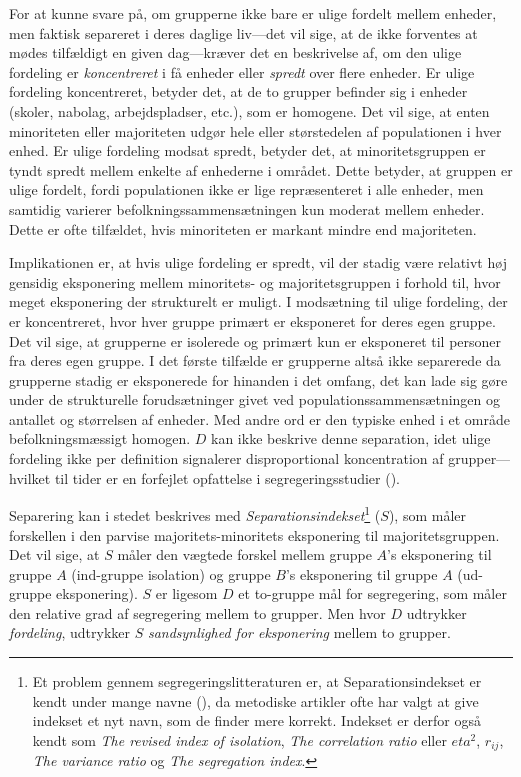 \documentclass[
]{book}
\begin{document}
For at kunne svare på, om grupperne ikke bare er ulige fordelt mellem enheder, men faktisk separeret i deres daglige liv---det vil sige, at de ikke forventes at mødes tilfældigt en given dag---kræver det en beskrivelse af, om den ulige fordeling er \emph{koncentreret} i få enheder eller \emph{spredt} over flere enheder. Er ulige fordeling koncentreret, betyder det, at de to grupper befinder sig i enheder (skoler, nabolag, arbejdspladser, etc.), som er homogene. Det vil sige, at enten minoriteten eller majoriteten udgør hele eller størstedelen af populationen i hver enhed. Er ulige fordeling modsat spredt, betyder det, at minoritetsgruppen er tyndt spredt mellem enkelte af enhederne i området. Dette betyder, at gruppen er ulige fordelt, fordi populationen ikke er lige repræsenteret i alle enheder, men samtidig varierer befolkningssammensætningen kun moderat mellem enheder. Dette er ofte tilfældet, hvis minoriteten er markant mindre end majoriteten.

Implikationen er, at hvis ulige fordeling er spredt, vil der stadig være relativt høj gensidig eksponering mellem minoritets- og majoritetsgruppen i forhold til, hvor meget eksponering der strukturelt er muligt. I modsætning til ulige fordeling, der er koncentreret, hvor hver gruppe primært er eksponeret for deres egen gruppe. Det vil sige, at grupperne er isolerede og primært kun er eksponeret til personer fra deres egen gruppe. I det første tilfælde er grupperne altså ikke separerede da grupperne stadig er eksponerede for hinanden i det omfang, det kan lade sig gøre under de strukturelle forudsætninger givet ved populationssammensætningen og antallet og størrelsen af enheder. Med andre ord er den typiske enhed i et område befolkningsmæssigt homogen. \(D\) kan ikke beskrive denne separation, idet ulige fordeling ikke per definition signalerer disproportional koncentration af grupper---hvilket til tider er en forfejlet opfattelse i segregeringsstudier ().

Separering kan i stedet beskrives med \emph{Separationsindekset}\footnote{Et problem gennem segregeringslitteraturen er, at Separationsindekset er kendt under mange navne (), da metodiske artikler ofte har valgt at give indekset et nyt navn, som de finder mere korrekt. Indekset er derfor også kendt som \emph{The revised index of isolation}, \emph{The correlation ratio} eller \(eta^{2}\), \(r_{ij}\), \emph{The variance ratio} og \emph{The segregation index}.} (\(S\)), som måler forskellen i den parvise majoritets-minoritets eksponering til majoritetsgruppen. Det vil sige, at \(S\) måler den vægtede forskel mellem gruppe \(A\)'s eksponering til gruppe \(A\) (ind-gruppe isolation) og gruppe \(B\)'s eksponering til gruppe \(A\) (ud-gruppe eksponering). \(S\) er ligesom \(D\) et to-gruppe mål for segregering, som måler den relative grad af segregering mellem to grupper. Men hvor \(D\) udtrykker \emph{fordeling}, udtrykker \(S\) \emph{sandsynlighed for eksponering} mellem to grupper.
\end{document}
